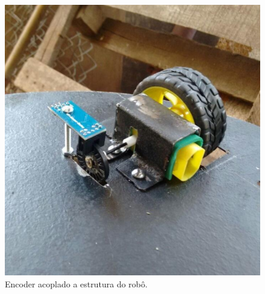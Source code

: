 \begin{itemize}
        \begin{figure}[H]                                                           
            \centering                                                                
            \includegraphics[scale=0.4]{figuras/novosistema.png}               
            \caption{Encoder acoplado a estrutura do robô.}    
            \label{img:novosistema}                                            
         \end{figure}

   \end{itemize}
 		

